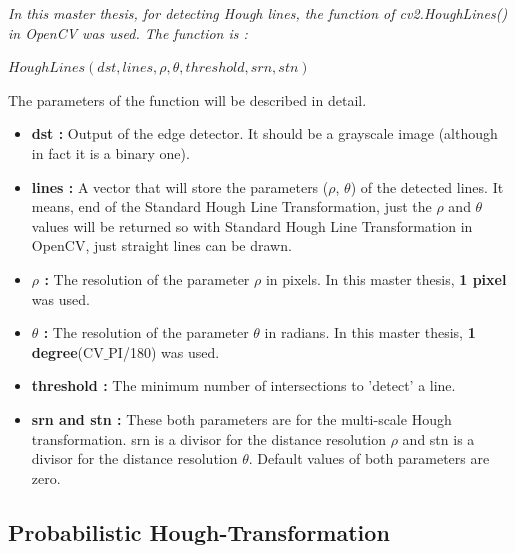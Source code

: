 \emph{\color{blue}In this master thesis, for detecting Hough lines, the function of \textit{cv2.HoughLines()} in OpenCV was used. The function is :}

  \begin{center}
  
$HoughLines(dst, lines, \rho, \theta, threshold, srn, stn )  $

  \end{center}

The parameters of the function will be described in detail.\cite{Standard_Hough_Transformation2}
 
\begin{itemize}

\item \textbf{dst : }Output of the edge detector. It should be a grayscale image (although in fact it is a binary one).
 
\item \textbf{lines : }A vector that will store the parameters ($ \rho $, $ \theta $) of the detected lines. It means, end of the Standard Hough Line Transformation, just the $ \rho $ and $ \theta $ values will be returned so with Standard Hough Line Transformation in OpenCV, just straight lines can be drawn.

\item \textbf{$ \rho $ : }The resolution of the parameter $ \rho $ in pixels. In this master thesis, \textbf{1 pixel} was used.

\item \textbf{$ \theta $ : }The resolution of the parameter $ \theta $ in radians. In this master thesis, \textbf{1 degree}(CV$ \_ $PI/180) was used.

\item \textbf{threshold : }The minimum number of intersections to 'detect' a line.

\item \textbf{srn and stn : }These both parameters are for the multi-scale Hough transformation. srn is a divisor for the distance resolution $ \rho $ and stn is a divisor for the distance resolution $ \theta $. Default values of both parameters are zero.

\end{itemize}

%
\subsection{Probabilistic Hough-Transformation}\label{sec:Probabilistic Hough-Transformation}
%

